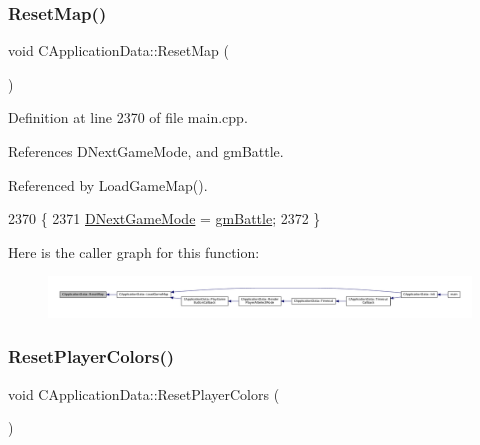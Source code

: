 \subsubsection{\texorpdfstring{Reset\+Map()}{ResetMap()}}
{\footnotesize\ttfamily void C\+Application\+Data\+::\+Reset\+Map (\begin{DoxyParamCaption}{ }\end{DoxyParamCaption})\hspace{0.3cm}{\ttfamily [protected]}}



Definition at line 2370 of file main.\+cpp.



References D\+Next\+Game\+Mode, and gm\+Battle.



Referenced by Load\+Game\+Map().


\begin{DoxyCode}
2370                                \{
2371     \hyperlink{classCApplicationData_a3b67edeacd70201dcf96fa9fa8aa2107}{DNextGameMode} = \hyperlink{classCApplicationData_ac8ac37a4c8bb871036fbbdc6a072e403a00a1759bd54eaaa07aab7575dbae51fc}{gmBattle};
2372 \}
\end{DoxyCode}
Here is the caller graph for this function\+:\nopagebreak
\begin{figure}[H]
\begin{center}
\leavevmode
\includegraphics[width=350pt]{classCApplicationData_a18ae4aed31d9ef2416059e66babb05b0_icgraph}
\end{center}
\end{figure}
\hypertarget{classCApplicationData_a46653e8a3ed079f3921ec0257e49eb89}{}\label{classCApplicationData_a46653e8a3ed079f3921ec0257e49eb89} 
\subsubsection{\texorpdfstring{Reset\+Player\+Colors()}{ResetPlayerColors()}}
{\footnotesize\ttfamily void C\+Application\+Data\+::\+Reset\+Player\+Colors (\begin{DoxyParamCaption}{ }\end{DoxyParamCaption})\hspace{0.3cm}{\ttfamily [protected]}}



